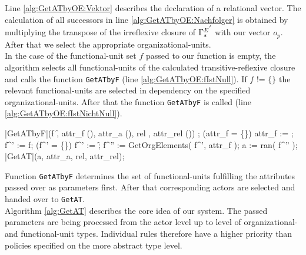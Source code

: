\noindent Line \ref{alg:GetATbyOE:Vektor} describes the declaration of a relational vector. The calculation of all successors in line \ref{alg:GetATbyOE:Nachfolger} is obtained by multiplying the transpose of the irreflexive closure of ${\relstrukturOE_F}^{'}$ with our vector $o_{p}$. After that we select the appropriate organizational-units.\\

In the case of the functional-unit set $f$ passed to our function is empty, the algorithm selects all functional-units of the calculated transitive-reflexive closure and calls the function {\tt GetATbyF} (line \ref{alg:GetATbyOE:fIstNull}). If $f$ != $\{\}$ the relevant functional-units are selected in dependency on the specified organizational-units. After that the function {\tt GetATbyF} is called	(line \ref{alg:GetATbyOE:fIstNichtNull}).

	\begin{samepage}
	{\small
	\NumberProgramstrue
	\begin{algorithm}[GetATbyF]\label{alg:GetATbyF}
	\begin{program}
	\FUNCT |GetATbyF|(f \subset \f, attr_f \subset (\Bezeichner \times \WerteMenge), attr_a \subset (\Bezeichner \times \WerteMenge),
	rel \in \relname, attr_{rel} \subset (\Bezeichner \times \WerteMenge)) \subset \a
	\BEGIN
	\var {};
	\IF (attr_f = \{\})
	\THEN attr_f := \attribute;
	\FI
	f^{'} := f;
	\IF (f^{'} = \{\})
	\THEN f^{'} := \f;
	\FI
	f^{''} := GetOrgElements( f^{'}, attr_f );
	a := ran( f^{''} \lhd \relstrukturFA );
	\RETURN \quad |GetAT|(a, attr_a, rel, attr_{rel});
	\END
	\end{program}
	\end{algorithm}
	\NumberProgramsfalse
	}
	\end{samepage}

\noindent Function {\tt GetATbyF} determines the set of functional-units fulfilling the attributes passed over as parameters first. After that corresponding actors are selected and handed over to {\tt GetAT}.\\

Algorithm \ref{alg:GetAT} describes the core idea of our system. The passed parameters are being processed from the actor level up to level of organizational- and functional-unit types. Individual rules therefore have a higher priority than policies specified on the more abstract type level.

